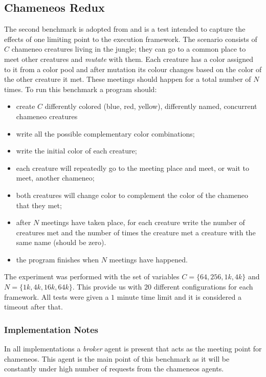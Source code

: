 \subsection{Chameneos Redux}
The second benchmark is adopted from \cite{Kaiser2003} and is a test intended to capture the effects of one limiting point to the execution framework. The scenario consists of $C$ chameneo creatures living in the jungle; they can go to a common place to meet other creatures and \textit{mutate} with them. Each creature has a color assigned to it from a color pool and after mutation its colour changes based on the color of the other creature it met. These meetings should happen for a total number of $N$ times. To run this benchmark a program should:
\begin{itemize}
    \item create $C$ differently colored (blue, red, yellow), differently named, concurrent chameneo creatures
    \item write all the possible complementary color combinations;
    \item write the initial color of each creature;
    \item each creature will repeatedly go to the meeting place and meet, or wait to meet, another chameneo;
    \item both creatures will change color to complement the color of the chameneo that they met;
    \item after $N$ meetings have taken place, for each creature write the number of creatures met and the number of times the creature met a creature with the same name (should be zero).
    \item the program finishes when $N$ meetings have happened.
\end{itemize}


The experiment was performed with the set of variables $C=\{64,256,1k,4k\}$ and $N=\{1k,4k,16k,64k\}$. This provide us with $20$ different configurations for each framework. All tests were given a $1$ minute time limit and it is considered a timeout after that.


\subsubsection{Implementation Notes} In all implementations a \textit{broker} agent is present that acts as the meeting point for chameneos. This agent is the main point of this benchmark as it will be constantly under high number of requests from the chameneos agents.

